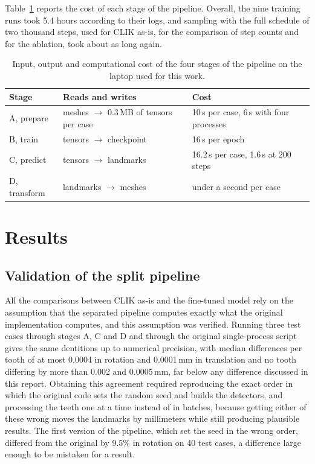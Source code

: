 \documentclass[10pt,a4paper]{article}
\begin{document}
Table~\ref{tab:stages} reports the cost of each stage of the pipeline. Overall, the nine training runs took 5.4 hours according to their logs, and sampling with the full schedule of two thousand steps, used for CLIK as-is, for the comparison of step counts and for the ablation, took about as long again.

\begin{table}[H]
\centering
\small
\begin{tabularx}{\textwidth}{@{}lXl@{}}
\toprule
Stage & Reads and writes & Cost \\
\midrule
A, prepare   & meshes $\rightarrow$ 0.3\,MB of tensors per case & 10\,s per case, 6\,s with four processes \\
B, train     & tensors $\rightarrow$ checkpoint        & 16\,s per epoch \\
C, predict   & tensors $\rightarrow$ landmarks         & 16.2\,s per case, 1.6\,s at 200 steps \\
D, transform & landmarks $\rightarrow$ meshes          & under a second per case \\
\bottomrule
\end{tabularx}
\caption{Input, output and computational cost of the four stages of the pipeline on the laptop used for this work.}
\label{tab:stages}
\end{table}


\section{Results}

\subsection{Validation of the split pipeline}
\label{sec:validation}

All the comparisons between CLIK as-is and the fine-tuned model rely on the assumption that the separated pipeline computes exactly what the original implementation computes, and this assumption was verified. Running three test cases through stages A, C and D and through the original single-process script gives the same dentitions up to numerical precision, with median differences per tooth of at most 0.0004\degree{} in rotation and 0.0001\,mm in translation and no tooth differing by more than 0.002\degree{} and 0.0005\,mm, far below any difference discussed in this report. Obtaining this agreement required reproducing the exact order in which the original code sets the random seed and builds the detectors, and processing the teeth one at a time instead of in batches, because getting either of these wrong moves the landmarks by millimeters while still producing plausible results. The first version of the pipeline, which set the seed in the wrong order, differed from the original by 9.5\% in rotation on 40 test cases, a difference large enough to be mistaken for a result.
\end{document}
